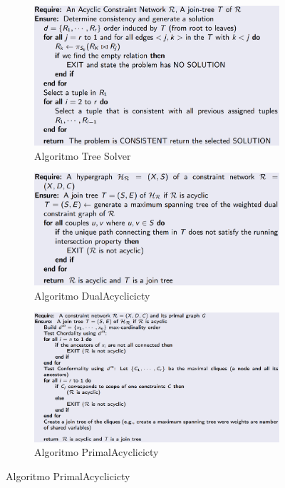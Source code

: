 \documentclass[11pt,oneside]{book}
\begin{document}
\begin{figure}[htp]
	\begin{subfigure}{0.3\textwidth}
        \centering
        \includegraphics[width=\textwidth, height=\textheight, keepaspectratio]{tree-solver.png}
        \caption{Algoritmo Tree Solver}
    \end{subfigure}
    \hfill
    \begin{subfigure}{0.3\textwidth}
        \centering
        \includegraphics[width=\textwidth, height=\textheight, keepaspectratio]{dual-acyclicicty.png}
        \caption{Algoritmo DualAcyclicicty}
    \end{subfigure}
    \hfill
    \begin{subfigure}{0.3\textwidth}
        \centering
        \includegraphics[width=\textwidth, height=\textheight, keepaspectratio]{primal-acyclicicty.png}
        \caption{Algoritmo PrimalAcyclicicty}
    \end{subfigure}
\end{figure}
\end{document}

